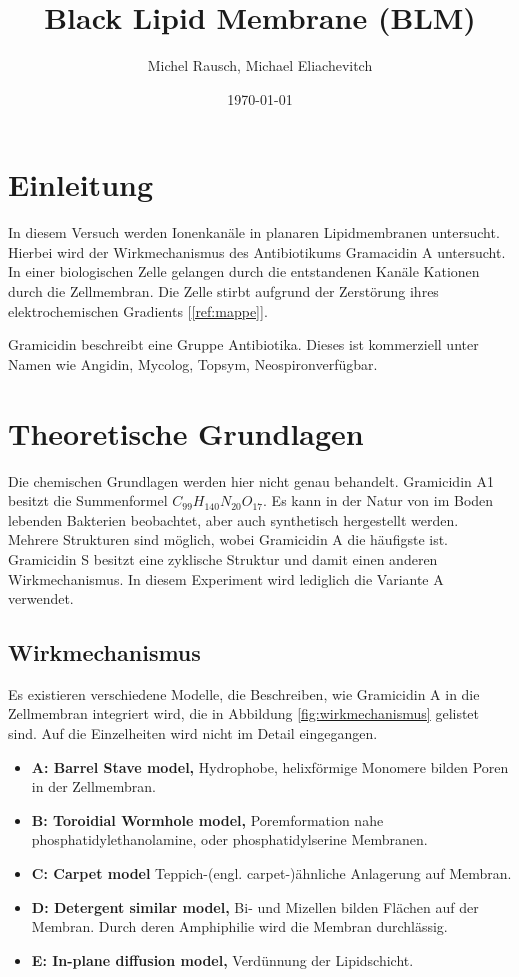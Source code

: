\documentclass[a4paper,ngerman]{scrartcl}
\title{Black Lipid Membrane (BLM)}
\date{\today}
\author{Michel Rausch, Michael Eliachevitch}
\begin{document}
\maketitle
\tableofcontents
\newpage

\section{Einleitung}

In diesem Versuch werden Ionenkanäle in planaren Lipidmembranen untersucht. Hierbei wird der Wirkmechanismus des Antibiotikums Gramacidin A untersucht. In einer biologischen Zelle gelangen durch die entstandenen Kanäle Kationen durch die Zellmembran. Die Zelle stirbt aufgrund der Zerstörung ihres elektrochemischen Gradients [\ref{ref:mappe}].

Gramicidin beschreibt eine Gruppe Antibiotika. Dieses ist kommerziell unter Namen wie Angidin\textregistered , Mycolog\textregistered , Topsym\textregistered , Neospiron\textregistered   verfügbar. 


\section{Theoretische Grundlagen}

Die chemischen Grundlagen werden hier nicht genau behandelt. Gramicidin A1 besitzt die Summenformel $C_{99}H_{140}N_{20}O_{17}$. Es kann in der Natur von im Boden lebenden Bakterien beobachtet, aber auch synthetisch hergestellt werden. Mehrere Strukturen sind möglich, wobei Gramicidin A die häufigste ist. Gramicidin S besitzt eine zyklische Struktur und damit einen anderen Wirkmechanismus. In diesem Experiment wird lediglich die Variante A verwendet.

\subsection{Wirkmechanismus}

Es existieren verschiedene Modelle, die Beschreiben, wie Gramicidin A in die Zellmembran integriert wird, die in Abbildung \ref{fig:wirkmechanismus} gelistet sind. Auf die Einzelheiten wird nicht im Detail eingegangen.
\begin{itemize}
\item \textbf{A: Barrel Stave model,} 
Hydrophobe, helixförmige Monomere bilden Poren in der Zellmembran.
\item \textbf{B: Toroidial Wormhole model,}  
Poremformation nahe phosphatidylethanolamine, oder phosphatidylserine Membranen. 
\item \textbf{C: Carpet model}  
Teppich-(engl. carpet-)ähnliche Anlagerung auf Membran.
\item \textbf{D:  Detergent similar model,}
Bi- und Mizellen bilden Flächen auf der Membran. Durch deren Amphiphilie wird die Membran durchlässig.
\item \textbf{E:  In-plane diffusion model,}
Verdünnung der Lipidschicht.
\end{itemize}
\end{document}
